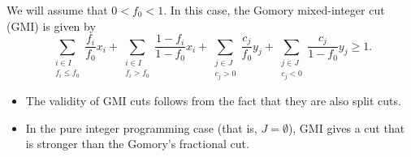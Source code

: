 We will assume that $0<f_0<1$. In this case, the Gomory mixed-integer cut (GMI) is given by
$$\sum_{\substack{i\in I\\f_i\leq f_0}}\frac{f_i}{f_0}x_i + \sum_{\substack{i\in I\\f_i> f_0}}\frac{1-f_i}{1-f_0}x_i+\sum_{\substack{j\in J\\c_j>0}}\frac{c_j}{f_0}y_j+\sum_{\substack{j\in J\\c_j<0}}\frac{c_j}{1-f_0}y_j\geq 1.$$

\begin{remark}
\text{ }
\begin{itemize}
	\item The validity of GMI cuts follows from the fact that they are also split cuts.
	\item In the pure integer programming case (that is, $J=\emptyset$), GMI gives a cut that is stronger than the Gomory's fractional cut.
\end{itemize}
\end{remark}





%
%
%

